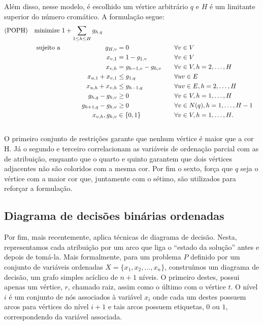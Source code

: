 \documentclass[11pt]{article}
\begin{document}
Além disso, nesse modelo, é escolhido um vértice arbitrário \(q\) e \(H\) é um limitante superior do número cromático.
A formulação segue:
\begin{alignat*}
\mathrm { (POPH) } \quad & \omit\rlap{minimize  $\displaystyle 1+\sum_{1 \leq h \leq H} g_{h, q}$} \\
& \mbox { sujeito a } && \quad & g_{H, v} &=0          & \quad & \forall v \in V \\
&                     &&   & x_{v, 1} &=1-g_{1, v} & \quad & \forall v \in V \\
&                     &&   & x_{v, h} &=g_{h-1, v}-g_{h, v} & \quad & \forall v \in V, h=2, \ldots, H \\
&                     &&   & x_{u, 1}+x_{v, 1} &\leq g_{1, q} & \quad & \forall u v \in E \\
&                     &&   & x_{u, h}+x_{v, h} &\leq g_{h-1, q} & \quad & \forall u v \in E, h=2, \ldots, H \\
&                     &&   & g_{h, q}-g_{h, v} &\geq 0 & \quad & \forall v \in V, h=1, \ldots, H \\
&                     &&   & g_{h+1, q}-g_{h, v} &\geq 0 & \quad & \forall v \in N(q), h=1, \ldots, H-1 \\
&                     &&   & x_{v, h}, g_{h, v} &\in\{0,1\} & \quad & \forall v \in V, h=1, \ldots, H \text {. } \\
&                     &&   &
\end{alignat*}
O primeiro conjunto de restrições garante que nenhum vértice é maior que a cor H.
Já o segundo e terceiro correlacionam as variáveis de ordenação parcial com as de atribuição, enquanto que o quarto e quinto garantem que dois vértices adjacentes não são coloridos com a mesma cor.
Por fim o sexto, força que \(q\) seja o vértice com a maior cor que, juntamente com o sétimo, são utilizados para reforçar a formulação.

\subsection{Diagrama de decisões binárias ordenadas}
\label{sec:org3cc8b06}
Por fim, mais recentemente, \textcite{Hoeve2021Graphcoloringdecision} aplica técnicas de diagrama de decisão.
Nesta, representamos cada atribuição por um arco que liga o ``estado da solução'' antes e depois de tomá-la.
Mais formalmente, para um problema \(P\) definido por um conjunto de variáveis ordenadas \(X = \{x_1,x_2,\dots ,x_n\}\), construímos um diagrama de decisão, um grafo simples acíclico de \(n+1\) níveis.
O primeiro destes, possui apenas um vértice, \(r\), chamado raiz, assim como o último com o vértice \(t\).
O nível \(i\) é um conjunto de nós associados à variável \(x_i\) onde cada um destes possuem arcos para vértices do nível \(i+1\) e tais arcos possuem etiquetas, \(0\) ou \(1\), correspondendo da variável associada.
\end{document}
